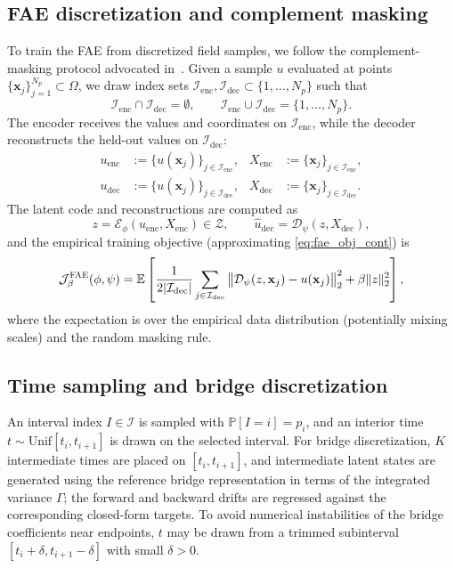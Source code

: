 \documentclass[review,onefignum,onetabnum]{siamart250211}
\newcommand{\E}{\mathbb{E}}
\newcommand{\1}{\mathbf{1}}
\newcommand{\cZ}{\mathcal{Z}}
\newcommand{\cJ}{\mathcal{J}}
\newcommand{\cE}{\mathcal{E}}
\newcommand{\cD}{\mathcal{D}}
\begin{document}
\subsection{\textsc{FAE} discretization and complement masking}\label{app:fae_mask}
To train the \textsc{FAE} from discretized field samples, we follow the complement-masking protocol advocated in~\cite{bunker2025fae}. Given a sample $u$ evaluated at points $\{\mathbf{x}_j\}_{j=1}^{N_p}\subset\Omega$, we draw index sets $\mathcal{I}_{\mathrm{enc}},\mathcal{I}_{\mathrm{dec}}\subset\{1,\dots,N_p\}$ such that
\begin{equation}
\mathcal{I}_{\mathrm{enc}}\cap\mathcal{I}_{\mathrm{dec}}=\emptyset,\qquad
\mathcal{I}_{\mathrm{enc}}\cup\mathcal{I}_{\mathrm{dec}}=\{1,\dots,N_p\}.
\label{eq:mask_sets_app}
\end{equation}
The encoder receives the values and coordinates on $\mathcal{I}_{\mathrm{enc}}$, while the decoder reconstructs the held-out values on $\mathcal{I}_{\mathrm{dec}}$:
\begin{align}
u_{\mathrm{enc}} &:= \{u(\mathbf{x}_j)\}_{j\in\mathcal{I}_{\mathrm{enc}}}, &
X_{\mathrm{enc}} &:= \{\mathbf{x}_j\}_{j\in\mathcal{I}_{\mathrm{enc}}}, \nonumber\\
u_{\mathrm{dec}} &:= \{u(\mathbf{x}_j)\}_{j\in\mathcal{I}_{\mathrm{dec}}}, &
X_{\mathrm{dec}} &:= \{\mathbf{x}_j\}_{j\in\mathcal{I}_{\mathrm{dec}}}.
\label{eq:enc_dec_data_app}
\end{align}
The latent code and reconstructions are computed as
\begin{equation}
z = \cE_\phi(u_{\mathrm{enc}},X_{\mathrm{enc}})\in\cZ,\qquad
\widehat u_{\mathrm{dec}} = \cD_\psi(z,X_{\mathrm{dec}}),
\label{eq:fae_maps_app}
\end{equation}
and the empirical training objective (approximating \eqref{eq:fae_obj_cont}) is
\begin{equation}
\cJ_{\beta}^{\mathrm{\textsc{FAE}}}(\phi,\psi)
= \E\left[
\frac{1}{2|\mathcal{I}_{\mathrm{dec}}|}\sum_{j\in\mathcal{I}_{\mathrm{dec}}}
\big\|\cD_\psi(z,\mathbf{x}_j)-u(\mathbf{x}_j)\big\|_2^2
+\beta\|z\|_2^2
\right],
\label{eq:fae_obj_app}
\end{equation}
where the expectation is over the empirical data distribution (potentially mixing scales) and the random masking rule.

\subsection{Time sampling and bridge discretization}\label{app:time_sampling}
An interval index $I\in\mathcal I$ is sampled with $\mathbb{P}[I=i]=p_i$, and an interior time $t\sim\mathrm{Unif}[t_i,t_{i+1}]$ is drawn on the selected interval. For bridge discretization, $K$ intermediate times are placed on $[t_i,t_{i+1}]$, and intermediate latent states are generated using the reference bridge representation in terms of the integrated variance $\Gamma$; the forward and backward drifts are regressed against the corresponding closed-form targets. To avoid numerical instabilities of the bridge coefficients near endpoints, $t$ may be drawn from a trimmed subinterval $[t_i+\delta,t_{i+1}-\delta]$ with small $\delta>0$.
\end{document}
